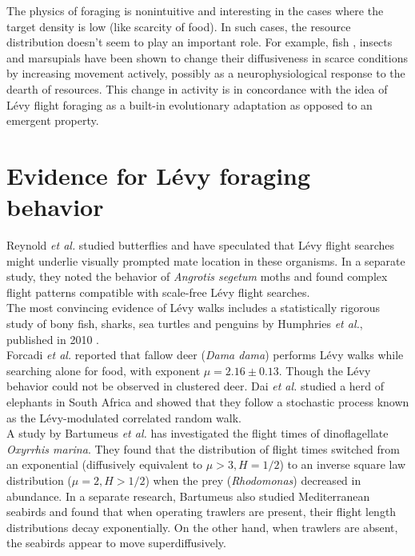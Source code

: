 \documentclass[12pt]{report}
\begin{document}
\begin{justify}
The physics of foraging is nonintuitive and interesting in the cases where the target density is low (like scarcity of food). In such cases, the resource distribution doesn't seem to play an important role. For example, fish \cite{fish, fish1}, insects \cite{insect} and marsupials \cite{marsupial} have been shown to change their diffusiveness in scarce conditions by increasing movement actively, possibly as a neurophysiological response to the dearth of resources. This change in activity is in concordance with the idea of L\'evy flight foraging as a built-in evolutionary adaptation as opposed to an emergent property.

\section{Evidence for L\'evy foraging behavior}
Reynold \textit{et al.} studied butterflies \cite{butterfly} and have speculated that L\'evy flight searches might underlie visually prompted mate location in these organisms. In a separate study, they noted the behavior of \textit{Angrotis segetum} moths \cite{moth} and found complex flight patterns compatible with scale-free L\'evy flight searches.\\

The most convincing evidence of L\'evy walks includes a statistically rigorous study of bony fish, sharks, sea turtles and penguins by Humphries \textit{et al.}, published in 2010 \cite{marine}.\\

Forcadi \textit{et al.} \cite{deer} reported that fallow deer (\textit{Dama dama}) performs L\'evy walks while searching alone for food, with exponent $\mu = 2.16 \pm 0.13$. Though the L\'evy behavior could not be observed in clustered deer. Dai \textit{et al.} \cite{elephant} studied a herd of elephants in South Africa and showed that they follow a stochastic process known as the L\'evy-modulated correlated random walk.\\

A study by Bartumeus \textit{et al.} \cite{dinoflagellates} has investigated the flight times of dinoflagellate \textit{Oxyrrhis marina}. They found that the distribution of flight times switched from an exponential (diffusively equivalent to $\mu > 3, H = 1/2$) to an inverse square law distribution ($\mu = 2, H > 1/2$) when the prey (\textit{Rhodomonas}) decreased in abundance. In a separate research, Bartumeus also studied Mediterranean seabirds \cite{seabird} and found that when operating trawlers are present, their flight length distributions decay exponentially. On the other hand, when trawlers are absent, the seabirds appear to move superdiffusively. \\


\end{justify}
\end{document}
